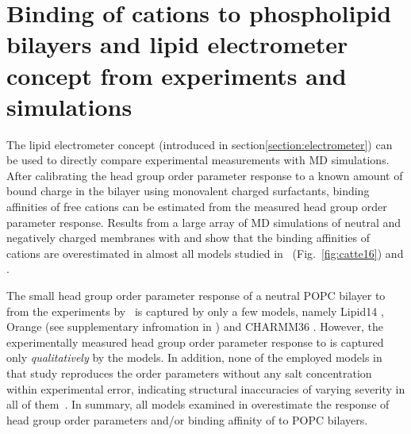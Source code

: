 \section{Binding of cations to phospholipid bilayers and lipid electrometer concept from experiments and simulations}
\label{section:electrometer_exp_sim} 

The lipid electrometer concept (introduced in section\ref{section:electrometer}) 
can be used to directly compare experimental measurements with MD simulations. 
After calibrating the head group order parameter response 
to a known amount of bound charge in the bilayer using monovalent charged surfactants,
binding affinities of free cations can be estimated from the measured head group order parameter response. \citep{scherer89}
Results from a large array of MD simulations of neutral and negatively charged membranes with  and  
show that the binding affinities of cations are overestimated in almost all models studied in~\citep{catte16} (Fig.~\ref{fig:catte16}) and \citep{nmrlipids_proj4}. 

The small head group order parameter response of a neutral POPC bilayer to  from the experiments by~\citet{seelig87} is captured by only a few models, 
namely Lipid14 \citep{dickson14}, Orange (see supplementary infromation in \citep{catte16}) and CHARMM36 \citep{klauda10}. 
However, the experimentally measured head group order parameter response to  is captured only \emph{qualitatively} by the models. \citep{catte16}
In addition, none of the employed models in that study reproduces the order parameters without any salt concentration
within experimental error, indicating structural inaccuracies of varying severity in all of them~\citep{botan15}.
In summary, all models examined in \citep{catte16} overestimate the response of head group order parameters and/or binding affinity of  to POPC bilayers. 



